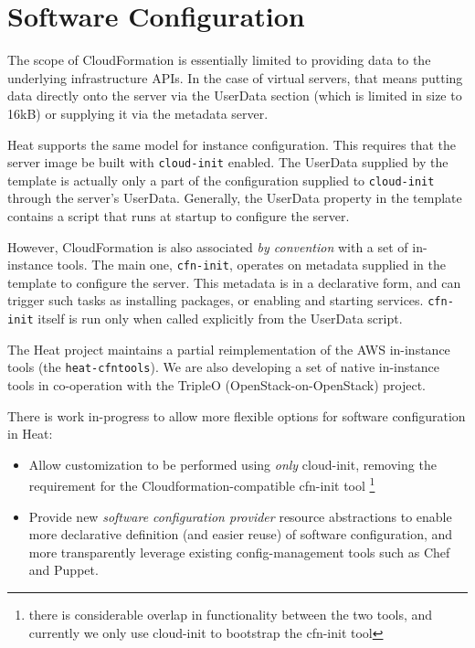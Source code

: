 \section{Software Configuration}

The scope of CloudFormation is essentially limited to providing data to the underlying infrastructure APIs. In the case of virtual servers, that means putting data directly onto the server via the UserData section (which is limited in size to 16kB) or supplying it via the metadata server.

Heat supports the same model for instance configuration.  This requires that the server image be built with \texttt{cloud-init} enabled. The UserData supplied by the template is actually only a part of the configuration supplied to \texttt{cloud-init} through the server's UserData. Generally, the UserData property in the template contains a script that runs at startup to configure the server.

However, CloudFormation is also associated \emph{by convention} with a set of in-instance tools. The main one, \texttt{cfn-init}, operates on metadata supplied in the template to configure the server. This metadata is in a declarative form, and can trigger such tasks as installing packages, or enabling and starting services. \texttt{cfn-init} itself is run only when called explicitly from the UserData script.

The Heat project maintains a partial reimplementation of the AWS in-instance tools (the \texttt{heat-cfntools}). We are also developing a set of native in-instance tools in co-operation with the TripleO (OpenStack-on-OpenStack) project.

There is work in-progress to allow more flexible options for software configuration in Heat:

\begin{itemize}
\item Allow customization to be performed using \emph{only} cloud-init, removing the requirement for the Cloudformation-compatible cfn-init tool \footnote{there is considerable overlap in functionality between the two tools, and currently we only use cloud-init to bootstrap the cfn-init tool}
\item Provide new \emph{software configuration provider} resource abstractions to enable more declarative definition (and easier reuse) of software configuration, and more transparently leverage existing config-management tools such as Chef and Puppet.
\end{itemize}
